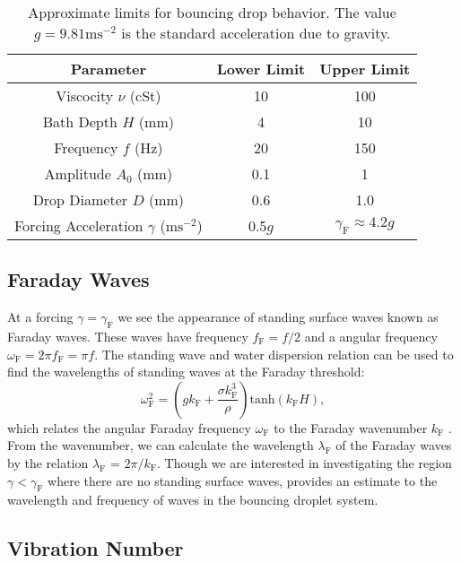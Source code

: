 	       \begin{table}[htdp] 
\caption[Basic Table 1]{Approximate limits for bouncing drop behavior. The value $g = 9.81\mathrm{ms}^{-2}$ is the standard acceleration due to gravity.} 
\begin{center} 
\begin{tabular}{c c c} 
\toprule 
  Parameter &  Lower Limit & Upper Limit \\
  \midrule
Viscocity $\nu$ (cSt) & 10 & 100 \\ 
Bath Depth $H$ (mm) & 4 & 10 \\
Frequency $f$ (Hz) & 20 & 150 \\
Amplitude $A_0$ (mm) & 0.1 & 1 \\
Drop Diameter $D$ (mm) & 0.6 & 1.0 \\
Forcing Acceleration $\gamma$ ($\mathrm{ms}^{-2}$) & 0.5$g$ & $\gamma_\mathrm{F} \approx 4.2g$ \\
\bottomrule 
\end{tabular}
\end{center}
\label{approxlimits} 
\end{table}	

\subsection{Faraday Waves}
	       At a forcing $\gamma = \gamma_\mathrm{F}$ we see the appearance of standing surface waves known as Faraday waves. These waves have frequency $f_\mathrm{F} = f/2$ and a angular frequency $\omega_\mathrm{F} = 2\pi f_\mathrm{F}=\pi f$. The standing wave and water dispersion relation can be used to find the wavelengths of standing waves at the Faraday threshold:
\begin{equation} \label{dispersion}
\omega_\mathrm{F}^2 = \left(gk_\mathrm{F}+\frac{\sigma k_\mathrm{F}^3}{\rho}\right)\mathrm{tanh}(k_\mathrm{F}H),
\end{equation} 
which relates the angular Faraday frequency $\omega_\mathrm{F}$ to the Faraday wavenumber $k_\mathrm{F}$ . From the wavenumber, we can calculate the wavelength $\lambda_\mathrm{F}$ of the Faraday waves by the relation $\lambda_\mathrm{F}$ = $2\pi/k_\mathrm{F}$. Though we are interested in investigating the region $\gamma < \gamma_\mathrm{F}$ where there are no standing surface waves,  provides an estimate to the wavelength and frequency of waves in the bouncing droplet system. 


\subsection{Vibration Number}

